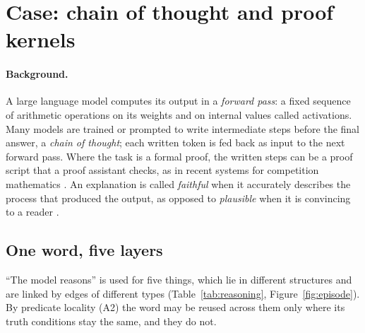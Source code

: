 \section{Case: chain of thought and proof kernels}
\label{sec:reasoning}

\paragraph{Background.} A large language model computes its output in a \emph{forward
pass}: a fixed sequence of arithmetic operations on its weights and on internal values
called activations. Many models are trained or prompted to write intermediate steps
before the final answer, a \emph{chain of thought}; each written token is fed back as
input to the next forward pass. Where the task is a formal proof, the written steps can
be a proof script that a proof assistant checks, as in recent systems for competition
mathematics \citep{hubert2025}. An explanation is called \emph{faithful} when it
accurately describes the process that produced the output, as opposed to \emph{plausible}
when it is convincing to a reader \citep{jacovi2020}.

\subsection{One word, five layers}

``The model reasons'' is used for five things, which lie in different structures and are
linked by edges of different types (Table~\ref{tab:reasoning}, Figure~\ref{fig:episode}).
By predicate locality (A2) the word may be reused across them only where its truth
conditions stay the same, and they do not.

